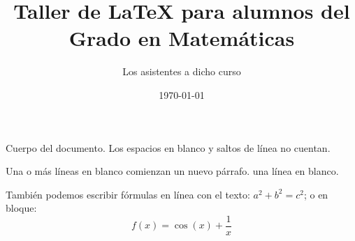 \documentclass{article}
\title{Taller de \LaTeX{} para alumnos del Grado en Matemáticas}
\author{Los asistentes a dicho curso}
\date{\today}
\begin{document}
	\maketitle
	
	Cuerpo del documento. Los       espacios en        blanco  y 
	saltos de línea      no cuentan. 
	
	
	Una o más líneas en blanco comienzan un nuevo párrafo.
	una línea en blanco. 
	
	También podemos escribir fórmulas en línea con el texto: $a^2+b^2=c^2$; o en bloque:
	\[
	f(x)=\cos(x)+\frac{1}{x}
	\]
\end{document}

